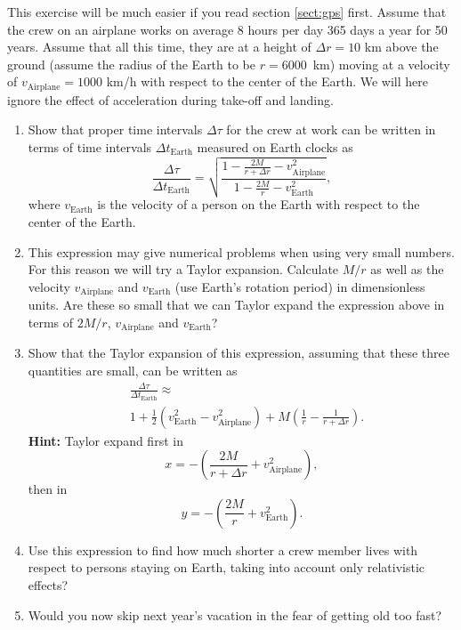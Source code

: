 {\begin{multicols}{2}
This exercise will be much easier if you read section \ref{sect:gps} first.
Assume that the crew on an airplane works on average 8 hours per day 365 days a year for 50 years. Assume that all this time, they are at a height of $\Delta r=10$ km above the ground (assume the radius of the Earth to be $r=6000$~km) moving at a velocity of $v_\mathrm{Airplane}=1000$ km/h with respect to the center of the Earth. We will here ignore the effect of acceleration during take-off and landing.
\begin{enumerate}
\item Show that proper time intervals $\Delta\tau$ for the crew at work can be written in terms of time intervals $\Delta t_\mathrm{Earth}$ measured on Earth clocks as
\[
\frac{\Delta\tau}{\Delta t_\mathrm{Earth}}=\sqrt{\frac{1-\frac{2M}{r+\Delta r}-v_\mathrm{Airplane}^2}{1-\frac{2M}{r}-v_\mathrm{Earth}^2}},
\]
where $v_\mathrm{Earth}$ is the velocity of a person on the Earth with respect to the center of the Earth.
\item This expression may give numerical problems when using very small numbers. For this reason we will try a Taylor expansion. Calculate $M/r$ as well as the velocity $v_\mathrm{Airplane}$ and $v_\mathrm{Earth}$ (use Earth's rotation period) in dimensionless units. Are these so small that we can Taylor expand the expression above in terms of $2M/r$, $v_\mathrm{Airplane}$ and  $v_\mathrm{Earth}$?
\item Show that the Taylor expansion of this expression, assuming that these three quantities are small, can be written as
\begin{align*}
&\frac{\Delta\tau}{\Delta t_\mathrm{Earth}}\approx\\
&1+\frac{1}{2}(v_\mathrm{Earth}^2-v_\mathrm{Airplane}^2)+M\left(\frac{1}{r}-\frac{1}{r+\Delta r}\right).
\end{align*}
{\bf Hint:} Taylor expand first in 
\[
x=-(\frac{2M}{r+\Delta r}+v_\mathrm{Airplane}^2),
\]
then in 
\[
y=-(\frac{2M}{r}+v_\mathrm{Earth}^2).
\]
\item Use this expression to find how much shorter a crew member lives with respect to persons staying on Earth, taking into account only relativistic effects?
\item Would you now skip next year's vacation in the fear of getting old too fast?
\end{enumerate}

\vspace{0.5cm}



\end{multicols}}
